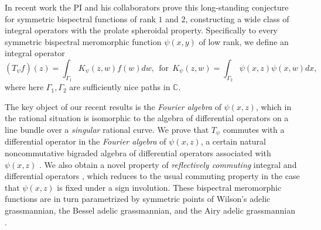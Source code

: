 \documentclass[11pt,letterpaper]{article}
\theoremstyle{definition}
\newcommand{\bbc}{\mathbb{C}}
\newcommand{\vocab}[1]{\emph{#1}}
\begin{document}
In recent work \cite{CGYZ,CGYZ2,CY2019} the PI and his collaborators prove this long-standing conjecture for symmetric bispectral functions of rank $1$ and $2$, constructing a wide class of integral operators with the prolate spheroidal property.  Specifically to every symmetric bispectral meromorphic function $\psi(x,y)$ of low rank, we define an integral operator
$$(T_\psi f)(z) = \int_{\Gamma_1}K_\psi(z,w)f(w)dw,\ \ \text{for}\ \ K_\psi(z,w) = \int_{\Gamma_2} \psi(x,z)\psi(x,w)dx,$$
where here $\Gamma_1,\Gamma_2$ are sufficiently nice paths in $\bbc$.

The key object of our recent results is the \vocab{Fourier algebra} of $\psi(x,z)$, which in the rational situation is isomorphic to the algebra of differential operators on a line bundle over a \emph{singular} rational curve.
We prove that $T_\psi$ commutes with a differential operator in the \vocab{Fourier algebra} of $\psi(x,z)$, a certain natural noncommutative bigraded algebra of differential operators associated with $\psi(x,z)$ \cite{CY2019}.
We also obtain a novel property of \vocab{reflectively commuting} integral and differential operators \cite{CGYZ,CGYZ2}, which reduces to the usual commuting property in the case that $\psi(x,z)$ is fixed under a sign involution.
These bispectral meromorphic functions are in turn parametrized by symmetric points of Wilson's adelic grassmannian, the Bessel adelic grassmannian, and the Airy adelic grassmannian \cite{Bakalov,Wilson}.
\end{document}
